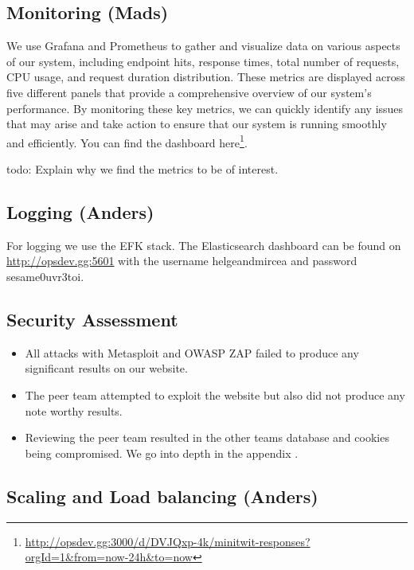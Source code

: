 \documentclass{article}
\begin{document}
\subsection{Monitoring (Mads)}
We use Grafana and Prometheus to gather and visualize data on various aspects of our system, including endpoint hits, response times, total number of requests, CPU usage, and request duration distribution. These metrics are displayed across five different panels that provide a comprehensive overview of our system's performance. By monitoring these key metrics, we can quickly identify any issues that may arise and take action to ensure that our system is running smoothly and efficiently. You can find the dashboard here\footnote{\url{http://opsdev.gg:3000/d/DVJQxp-4k/minitwit-responses?orgId=1&from=now-24h&to=now}}.

todo: Explain why we find the metrics to be of interest.

\subsection{Logging (Anders)}

For logging we use the EFK stack. The Elasticsearch dashboard can be found on \url{http://opsdev.gg:5601} with the username helgeandmircea and password sesame0uvr3toi.

\subsection{Security Assessment}

\begin{itemize}
    \item All attacks with Metasploit and OWASP ZAP failed to produce any significant results on our website. 
    \item The peer team  attempted to exploit the website but also did not produce any note worthy results. 
    \item Reviewing the peer team resulted in the other teams database and cookies being compromised. We go into depth in the appendix \label{appendix:security assessment}.

\end{itemize}


 

\subsection{Scaling and Load balancing (Anders)}
\end{document}
